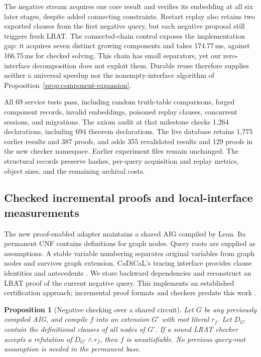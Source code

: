 \documentclass[11pt,a4paper]{article}
\numberwithin{equation}{section}
\theoremstyle{plain}
\newtheorem{proposition}[lemma]{Proposition}
\theoremstyle{definition}
\theoremstyle{remark}
\begin{document}
The negative stream acquires one core result and verifies its embedding at all six later stages, despite added connecting constraints. Restart replay also retains two exported clauses from the first negative query, but each negative proposal still triggers fresh LRAT. The connected-chain control exposes the implementation gap: it acquires seven distinct growing components and takes 174.77\,ms, against 166.75\,ms for checked solving. This chain has small separators, yet our zero-interface decomposition does not exploit them. Durable reuse therefore supplies neither a universal speedup nor the nonempty-interface algorithm of Proposition~\ref{prop:component-expansion}.

All 69 service tests pass, including random truth-table comparisons, forged component records, invalid embeddings, poisoned replay clauses, concurrent sessions, and migrations. The axiom audit at that milestone checks 1,264 declarations, including 694 theorem declarations. The live database retains 1,775 earlier results and 387 proofs, and adds 355 revalidated results and 129 proofs in the new checker namespace. Earlier experiment files remain unchanged. The structural records preserve hashes, per-query acquisition and replay metrics, object sizes, and the remaining archival costs.

\subsection{Checked incremental proofs and local-interface measurements}
\label{sec:incremental-proof-service}

The new proof-enabled adapter maintains a shared AIG compiled by Lean. Its permanent CNF contains definitions for graph nodes. Query roots are supplied as assumptions. A stable variable numbering separates original variables from graph nodes and survives graph extension. CaDiCaL's tracing interface provides clause identities and antecedents \citep{biere2024cadical}. We store backward dependencies and reconstruct an LRAT proof of the current negative query. This implements an established certification approach; incremental proof formats and checkers predate this work \citep{fazekas2024incremental}.

\begin{proposition}[Negative checking over a shared circuit]
\label{prop:incremental-proof}
Let $G$ be any previously compiled AIG, and compile $f$ into an extension $G'$ with root literal $r_f$. Let $D_{G'}$ contain the definitional clauses of all nodes of $G'$. If a sound LRAT checker accepts a refutation of $D_{G'}\land r_f$, then $f$ is unsatisfiable. No previous query-root assumption is needed in the permanent base.
\end{proposition}
\end{document}
